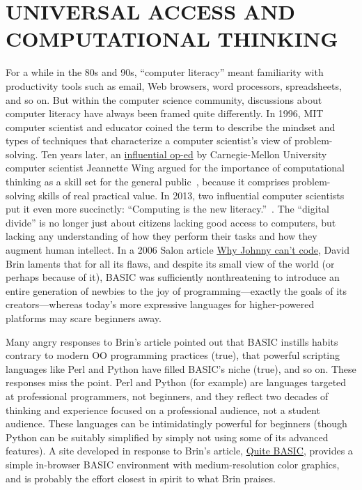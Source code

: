 
\section{UNIVERSAL ACCESS AND COMPUTATIONAL THINKING}




For a while in the 80s and 90s, ``computer literacy'' meant familiarity
with productivity tools such as email, Web browsers, word processors,
spreadsheets, and so on.
But within the computer science community, discussions about computer
literacy have always been framed quite differently.
In 1996, MIT computer scientist and educator  coined
the term  to describe the mindset and types of
techniques that characterize a computer scientist's view of
problem-solving.
Ten years later, an
\href{http://www.cs.cmu.edu/afs/cs/usr/wing/www/publications/Wing06.pdf}{influential
op-ed} by Carnegie-Mellon University computer scientist Jeannette Wing
argued for the importance of computational thinking as a skill set for
the general public~\cite{wing_computational_thinking}, because it
comprises problem-solving skills of real practical value.
In 2013, two influential computer scientists put it even more
succinctly: ``Computing is the new
literacy.''~\cite{ieee_computer_special_issue_computing_education}.
The ``digital divide'' is no longer just about citizens lacking good
access to computers, but lacking any understanding of how they perform
their tasks and how they augment human intellect.
In a 2006 Salon article \href{www.salon.com/2006/09/14/basic_2}{Why
Johnny can't code}, David Brin laments that for all its flaws, and
despite its small view of the world (or perhaps because of it), BASIC
was sufficiently nonthreatening to introduce an entire generation of
newbies to the joy of programming---exactly the goals of its
creators---whereas today's more expressive languages for higher-powered
platforms may scare beginners away.

Many angry responses to Brin's article pointed out that BASIC
instills habits contrary to modern OO programming practices (true),
that powerful scripting languages like Perl and Python have filled BASIC's
niche (true), and so on.  These responses miss the point.  
Perl and Python (for example) are languages
targeted at professional programmers, not beginners, and they
reflect two decades of thinking and experience focused on a professional audience,
not a student audience.  These languages can be intimidatingly powerful
for beginners (though Python can be suitably simplified by simply
not using some of its advanced features).
A site developed in response to Brin's article, 
\href{http://quitebasic.com}{Quite BASIC}, provides a simple in-browser
BASIC environment with medium-resolution color graphics, and is probably
the effort closest in spirit to what Brin praises.


